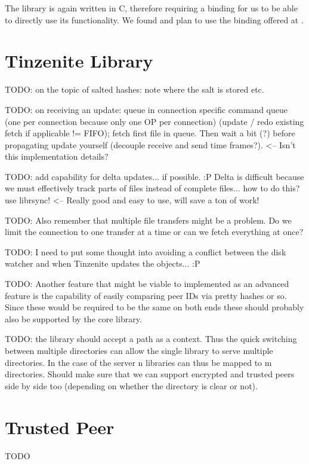The library is again written in C, therefore requiring a binding for us to be able to directly use its functionality.
We found and plan to use the binding offered at \cite{web:site:librsync:golang}.

\section{Tinzenite Library}

TODO: on the topic of salted hashes: note where the salt is stored etc.

TODO: on receiving an update: queue in connection specific command queue (one per connection because only one OP per connection) (update / redo existing fetch if applicable != FIFO); fetch first file in queue.
Then wait a bit (?) before propagating update yourself (decouple receive and send time frames?). <-- Isn't this implementation details?

TODO: add capability for delta updates... if possible. :P
Delta is difficult because we must effectively track parts of files instead of complete files... how to do this?
use librsync! <-- Really good and easy to use, will save a ton of work!

TODO: Also remember that multiple file transfers might be a problem.
Do we limit the connection to one transfer at a time or can we fetch everything at once?

TODO: I need to put some thought into avoiding a conflict between the disk watcher and when Tinzenite updates the objects... :P

TODO: Another feature that might be viable to implemented as an advanced feature is the capability of easily comparing peer IDs via pretty hashes or so.
Since these would be required to be the same on both ends these should probably also be supported by the core library.

TODO: the library should accept a path as a context.
Thus the quick switching between multiple directories can allow the single library to serve multiple directories.
In the case of the server n libraries can thus be mapped to m directories.
Should make sure that we can support encrypted and trusted peers side by side too (depending on whether the directory is clear or not).

\section{Trusted Peer}

TODO


